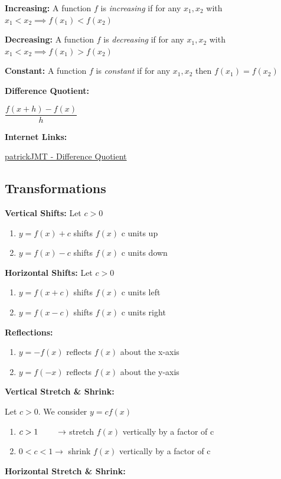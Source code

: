 \documentclass[12pt]{article}
\begin{document}
\textbf{Increasing:} A function $f$ is \textit{increasing} if for any $x_{1}, x_{2}$ with $x_{1} < x_{2} \implies f(x_{1}) < f(x_{2})$

\textbf{Decreasing:} A function $f$ is \textit{decreasing} if for any $x_{1}, x_{2}$ with $x_{1} < x_{2} \implies f(x_{1}) > f(x_{2})$

\textbf{Constant:} A function $f$ is \textit{constant} if for any $x_{1}, x_{2}$ then $f(x_{1}) = f(x_{2})$

\textbf{Difference Quotient:}
\newline

\centerline{$\dfrac{f(x+h) - f(x)}{h}$}

\textbf{Internet Links:}

\href{https://www.youtube.com/watch?v=v5P4y0OkED4}{patrickJMT - Difference Quotient}

\newpage

\subsection{Transformations}

\textbf{Vertical Shifts:} Let $c>0$

\begin{enumerate}
\item $y=f(x) + c$ shifts $f(x)$ c units up
\item $y=f(x) - c$ shifts $f(x)$ c units down
\end{enumerate}

\textbf{Horizontal Shifts:} Let $c>0$

\begin{enumerate}
\item $y=f(x+c)$ shifts $f(x)$ c units left
\item $y=f(x-c)$ shifts $f(x)$ c units right
\end{enumerate}

\textbf{Reflections:} 

\begin{enumerate}
\item $y=-f(x)$ reflects $f(x)$ about the x-axis
\item $y=f(-x)$ reflects $f(x)$ about the y-axis
\end{enumerate}

\textbf{Vertical Stretch \& Shrink:} 
\newline

\centerline{Let $c>0$. We consider $y=cf(x)$}

\begin{enumerate}
\item $c>1 \hspace{.75cm} \to$ stretch $f(x)$ vertically by a factor of c
\item $0<c<1 \to$ shrink $f(x)$ vertically by a factor of c
\end{enumerate}
\vspace{.5cm}
\textbf{Horizontal Stretch \& Shrink:} 
\newline
\end{document}
